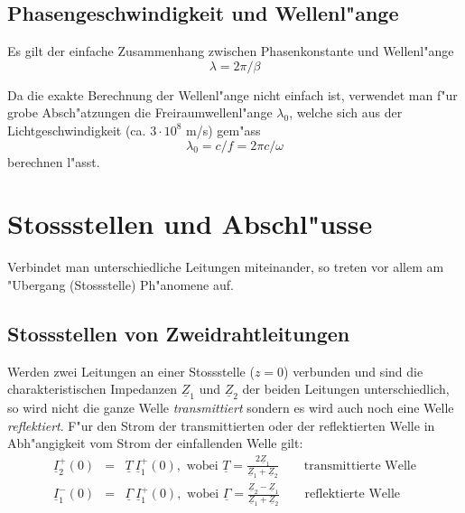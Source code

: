 \documentclass[german, 10pt, a4paper, headsepline]{scrreprt}
\theoremstyle{remark}
\begin{document}
\subsection{Phasengeschwindigkeit und Wellenl"ange}

Es gilt der einfache Zusammenhang zwischen Phasenkonstante und Wellenl"ange
\begin{displaymath}
	\lambda = 2\pi / \beta
\end{displaymath}

Da die exakte Berechnung der Wellenl"ange nicht einfach ist, verwendet man f"ur grobe Absch"atzungen die Freiraumwellenl"ange $\lambda_0$, welche sich aus der Lichtgeschwindigkeit (ca. $3\cdotp 10^8$ m/s) gem"ass
\begin{displaymath}
	\lambda_0 = c / f = 2 \pi c / \omega
\end{displaymath}
berechnen l"asst.

\section{Stossstellen und Abschl"usse}

Verbindet man unterschiedliche Leitungen miteinander, so treten vor allem am "Ubergang (Stossstelle) Ph"anomene auf. 

\subsection{Stossstellen von Zweidrahtleitungen}

Werden zwei Leitungen an einer Stossstelle ($z=0$) verbunden und sind die charakteristischen Impedanzen $\underline{Z}_1$ und $\underline{Z}_2$ der beiden Leitungen unterschiedlich, so wird nicht die ganze Welle \textit{transmittiert} sondern es wird auch noch eine Welle \textit{reflektiert}. F"ur den Strom der transmittierten oder der reflektierten Welle in Abh"angigkeit vom Strom der einfallenden Welle gilt:
\begin{eqnarray}
	\underline{I}_2^+(0)&	= &	\underline{T}\:\underline{I}_1^+(0),\mbox{ wobei } \underline{T} = \frac{2\underline{Z}_1}{\underline{Z}_1 + \underline{Z}_2} \qquad \mbox{transmittierte Welle} \nonumber \\
	\underline{I}_1^-(0)&	= &	\underline{\Gamma}\:\underline{I}_1^+(0),\mbox{ wobei } \underline{\Gamma} = \frac{\underline{Z}_2-\underline{Z}_1}{\underline{Z}_1 + \underline{Z}_2}  \qquad \mbox{reflektierte Welle}  \nonumber
\end{eqnarray}
\end{document}
